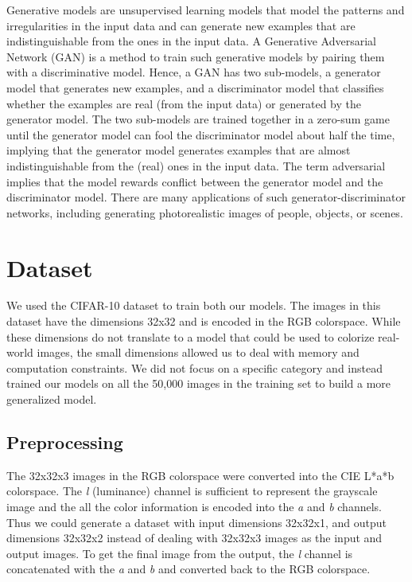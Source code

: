 \documentclass{article}
\begin{document}
Generative models are unsupervised learning models that model the patterns and
irregularities in the input data and can generate new examples that are
indistinguishable from the ones in the input data. A Generative Adversarial
Network (GAN) is a method to train such generative models by pairing them with a
discriminative model. Hence, a GAN has two sub-models, a generator model that
generates new examples, and a discriminator model that classifies whether the
examples are real (from the input data) or generated by the generator model. The
two sub-models are trained together in a zero-sum game until the generator model
can fool the discriminator model about half the time, implying that the
generator model generates examples that are almost indistinguishable from the
(real) ones in the input data. The term adversarial implies that the model
rewards conflict between the generator model and the discriminator model. There
are many applications of such generator-discriminator networks, including
generating photorealistic images of people, objects, or scenes.

\section{Dataset}

We used the CIFAR-10 dataset to train both our models. The images in this
dataset have the dimensions 32x32 and is encoded in the RGB colorspace. While
these dimensions do not translate to a model that could be used to colorize
real-world images, the small dimensions allowed us to deal with memory and
computation constraints. We did not focus on a specific category and instead
trained our models on all the 50,000 images in the training set to build a
more generalized model.

\subsection{Preprocessing}

The 32x32x3 images in the RGB colorspace were converted into the CIE L*a*b
colorspace. The \textit{l} (luminance) channel is sufficient to represent the
grayscale image and the all the color information is encoded into the \textit{a}
and \textit{b} channels. Thus we could generate a dataset with input dimensions
32x32x1, and output dimensions 32x32x2 instead of dealing with 32x32x3 images as
the input and output images. To get the final image from the output, the \textit{l}
channel is concatenated with the \textit{a} and \textit{b} and converted back to
the RGB colorspace.
\end{document}

